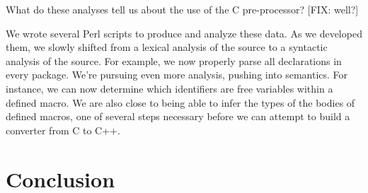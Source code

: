 What do these analyses tell us about the use of the C pre-processor?
[FIX: well?] 

We wrote several Perl scripts to produce and analyze these data.  As
we developed them, we slowly shifted from a lexical analysis of the
source to a syntactic analysis of the source.  For example, we now
properly parse all declarations in every package.  We're pursuing even
more analysis, pushing into semantics.  For instance, we can now
determine which identifiers are free variables within a defined macro.
We are also close to being able to infer the types of the bodies of
defined macros, one of several steps necessary before we can attempt
to build a converter from C to C++.

\section{Conclusion}\label{sec:conclusion}

\small 




